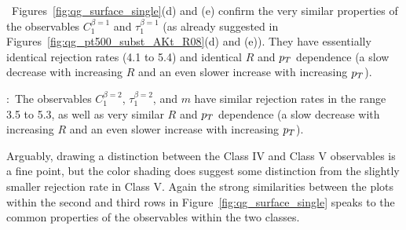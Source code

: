 ~Figures~\ref{fig:qg_surface_single}(d) and (e)  confirm
the very similar properties of the observables $C_1^{\beta=1}$ and $\tau_1^{\beta=1}$ (as already suggested in
Figures~\ref{fig:qg_pt500_subst_AKt_R08}(d) and (e)). They have
 essentially identical rejection rates (4.1 to 5.4) and identical $R$ and $p_T$ dependence (a slow decrease with increasing $R$ and an even
slower increase with increasing $p_T$).  

:~The observables $C_1^{\beta=2}$, $\tau_1^{\beta=2}$, and $m$ have similar rejection rates in the 
range 3.5 to 5.3, as well as very similar $R$ and $p_T$ dependence (a slow decrease with increasing $R$ and an even
slower increase with increasing $p_T$).  

Arguably, drawing a distinction between the Class IV and Class V observables is a fine point, 
but the color shading does suggest some
distinction from the slightly smaller rejection rate in Class V.  Again the strong similarities between the plots within the second and third rows in 
Figure~\ref{fig:qg_surface_single} speaks to the common properties of the observables within the two classes.


 


